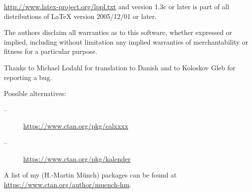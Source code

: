 \documentclass{article}
\begin{document}
\url{http://www.latex-project.org/lppl.txt}\newline
and version 1.3c or later is part of all distributions of \LaTeX{} version
2005/12/01 or later.

The authors disclaim all warranties as to this software, whether expressed or
implied, including without limitation any implied warranties of
merchantability or fitness for a particular purpose.

Thanks to Michael Lodahl for translation to Danish and to Koloskov Gleb for
reporting a bug.

\noindent Possible alternatives:
\begin{description}
\item[--] \url{https://www.ctan.org/pkg/calxxxx}
\item[--] \url{https://www.ctan.org/pkg/kalender}
\end{description}

\noindent A list of my (H.-Martin M\"{u}nch) packages can be found at\newline
\url{https://www.ctan.org/author/muench-hm}.
\end{document}
